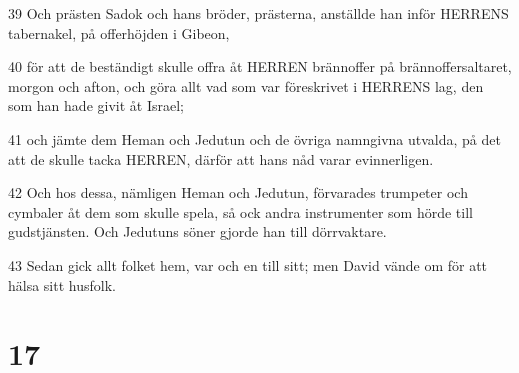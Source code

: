 \par 39 Och prästen Sadok och hans bröder, prästerna, anställde han inför HERRENS tabernakel, på offerhöjden i Gibeon,
\par 40 för att de beständigt skulle offra åt HERREN brännoffer på brännoffersaltaret, morgon och afton, och göra allt vad som var föreskrivet i HERRENS lag, den som han hade givit åt Israel;
\par 41 och jämte dem Heman och Jedutun och de övriga namngivna utvalda, på det att de skulle tacka HERREN, därför att hans nåd varar evinnerligen.
\par 42 Och hos dessa, nämligen Heman och Jedutun, förvarades trumpeter och cymbaler åt dem som skulle spela, så ock andra instrumenter som hörde till gudstjänsten. Och Jedutuns söner gjorde han till dörrvaktare.
\par 43 Sedan gick allt folket hem, var och en till sitt; men David vände om för att hälsa sitt husfolk.

\chapter{17}

